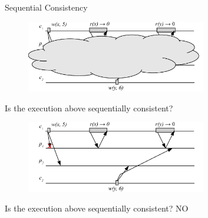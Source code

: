 \begin{frame}{Sequential Consistency}

\begin{overprint}

\begin{figure}
\includegraphics[width=0.7\textwidth]{figs/09/seq-02}
\end{figure}

\begin{example}

\BIL
\item Is the execution above sequentially consistent? 
\EIL

\end{example}

\begin{figure}
\includegraphics[width=0.7\textwidth]{figs/09/seq-02n}
\end{figure}

\begin{example}

\BIL
\item Is the execution above sequentially consistent? NO
\EIL

\end{example}

\end{overprint}

\end{frame}

